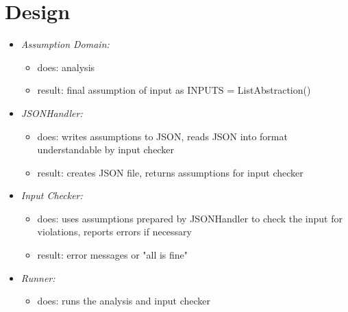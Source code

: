 \documentclass[11pt]{article}
\begin{document}
\section{Design}

\begin{itemize}
\item \textit{Assumption Domain:}
\begin{itemize}
\item does: analysis
\item result: final assumption of input as INPUTS = ListAbstraction()
\end{itemize}

\item \textit{JSONHandler:} 
\begin{itemize}
\item does: writes assumptions to JSON, reads JSON into format understandable by input checker
\item result: creates JSON file, returns assumptions for input checker
\end{itemize}


\item \textit{Input Checker:} 
\begin{itemize}
\item does: uses assumptions prepared by JSONHandler to check the input for violations, reports errors if necessary
\item result: error messages or "all is fine"
\end{itemize}


\item \textit{Runner:} 
\begin{itemize}
\item does: runs the analysis and input checker
\end{itemize}

\end{itemize}
\end{document}
